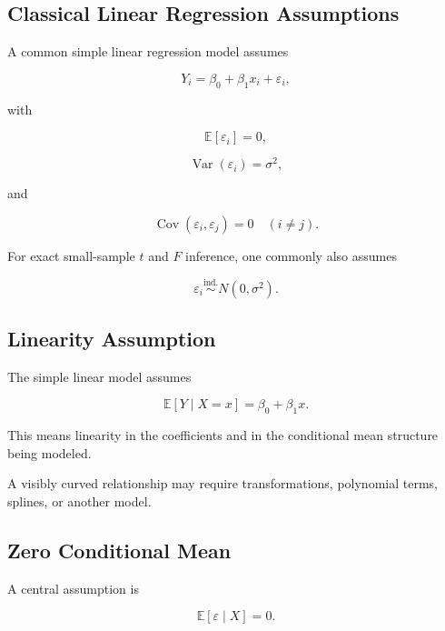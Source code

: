 \subsection{Classical Linear Regression Assumptions}
\label{subsec:classical-linear-regression-assumptions}

A common simple linear regression model assumes

\[
\boxed{
Y_i
=
\beta_0+\beta_1x_i+\varepsilon_i,
}
\]

with

\[
\boxed{
\mathbb{E}[\varepsilon_i]=0,
}
\]

\[
\boxed{
\operatorname{Var}(\varepsilon_i)=\sigma^2,
}
\]

and

\[
\boxed{
\operatorname{Cov}(\varepsilon_i,\varepsilon_j)=0
\quad
(i\neq j).
}
\]

For exact small-sample \(t\) and \(F\) inference, one commonly also
assumes

\[
\boxed{
\varepsilon_i
\overset{\text{ind.}}{\sim}
N(0,\sigma^2).
}
\]

\subsection{Linearity Assumption}
\label{subsec:regression-linearity-assumption}

The simple linear model assumes

\[
\boxed{
\mathbb{E}[Y\mid X=x]
=
\beta_0+\beta_1x.
}
\]

This means linearity in the coefficients and in the conditional mean
structure being modeled.

A visibly curved relationship may require transformations, polynomial
terms, splines, or another model.

\subsection{Zero Conditional Mean}
\label{subsec:zero-conditional-mean}

A central assumption is

\[
\boxed{
\mathbb{E}[\varepsilon\mid X]=0.
}
\]

